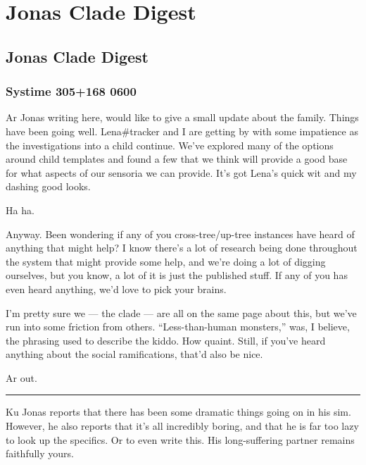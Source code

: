 \chapter{Jonas Clade Digest}

\hypertarget{jonas-clade-digest}{%
\section*{Jonas Clade Digest}\label{jonas-clade-digest}}

\hypertarget{systime-305168-0600}{%
\subsection*{Systime 305+168 0600}\label{systime-305168-0600}}

Ar Jonas writing here, would like to give a small update about the family. Things have been going well. Lena\#tracker and I are getting by with some impatience as the investigations into a child continue. We've explored many of the options around child templates and found a few that we think will provide a good base for what aspects of our sensoria we can provide. It's got Lena's quick wit and my dashing good looks.

Ha ha.

Anyway. Been wondering if any of you cross-tree/up-tree instances have heard of anything that might help? I know there's a lot of research being done throughout the system that might provide some help, and we're doing a lot of digging ourselves, but you know, a lot of it is just the published stuff. If any of you has even heard anything, we'd love to pick your brains.

I'm pretty sure we --- the clade --- are all on the same page about this, but we've run into some friction from others. ``Less-than-human monsters,'' was, I believe, the phrasing used to describe the kiddo. How quaint. Still, if you've heard anything about the social ramifications, that'd also be nice.

Ar out.

\begin{center}\rule{0.5\linewidth}{\linethickness}\end{center}

Ku Jonas reports that there has been some dramatic things going on in his sim. However, he also reports that it's all incredibly boring, and that he is far too lazy to look up the specifics. Or to even write this. His long-suffering partner remains faithfully yours.

